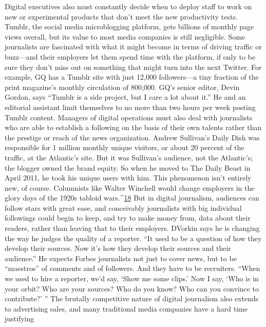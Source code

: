 Digital executives also must constantly decide when to deploy staff to work
on new or experimental products that don’t meet the new productivity tests.
Tumblr, the social media microblogging platform, gets billions of monthly page
views overall, but its value to most media companies is still negligible. Some
journalists are fascinated with what it might become in terms of driving traffic
or buzz—and their employers let them spend time with the platform, if only to
be sure they don’t miss out on something that might turn into the next Twitter.
For example, GQ has a Tumblr site with just 12,000 followers—a tiny fraction of
the print magazine’s monthly circulation of 800,000. GQ’s senior editor, Devin
Gordon, says ``Tumblr is a side project, but I care a lot about it.'' He and an
editorial assistant limit themselves to no more than two hours per week posting
Tumblr content.
Managers of digital operations must also deal with journalists who are able to
establish a following on the basis of their own talents rather than the prestige or
reach of the news organization. Andrew Sullivan’s Daily Dish was responsible
for 1 million monthly unique visitors, or about 20 percent of the traffic, at the
Atlantic’s site. But it was Sullivan’s audience, not the Atlantic’s; the blogger owned
the brand equity. So when he moved to The Daily Beast in April 2011, he took
his unique users with him. This phenomenon isn’t entirely new, of course. Columnists
like Walter Winchell would change employers in the glory days of the
1920s tabloid wars.^{\href{#endnotes-ch9}{18}} But in digital journalism, audiences can follow stars with
great ease, and conceivably journalists with big individual followings could begin
to keep, and try to make money from, data about their readers, rather than leaving
that to their employers.
DVorkin says he is changing the way he judges the quality of a reporter. ``It
used to be a question of how they develop their sources. Now it’s how they develop
their sources and their audience.'' He expects Forbes journalists not just to
cover news, but to be ``maestros'' of comments and of followers. And they have to
be recruiters. ``When we used to hire a reporter, we’d say, ‘Show me some clips.’
Now I say, ‘Who is in your orbit? Who are your sources? Who do you know?
Who can you convince to contribute?’ ''
The brutally competitive nature of digital journalism also extends to advertising
sales, and many traditional media companies have a hard time justifying
